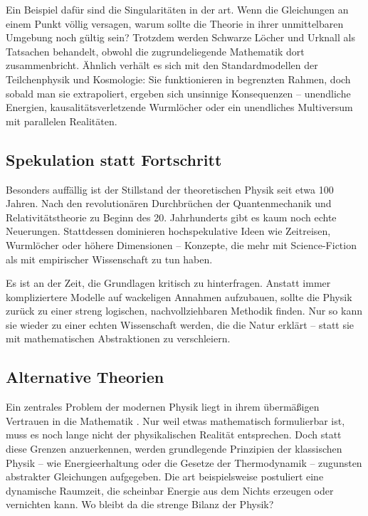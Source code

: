 Ein Beispiel dafür sind die Singularitäten in der \gls{art}. Wenn die Gleichungen an einem Punkt völlig versagen, warum sollte die Theorie in ihrer unmittelbaren Umgebung noch gültig sein?
Trotzdem werden Schwarze Löcher und Urknall als Tatsachen behandelt, obwohl die zugrundeliegende Mathematik dort zusammenbricht. Ähnlich verhält es sich mit den Standardmodellen der
Teilchenphysik und Kosmologie: Sie funktionieren in begrenzten Rahmen, doch sobald man sie extrapoliert, ergeben sich unsinnige Konsequenzen – unendliche Energien, kausalitätsverletzende
Wurmlöcher oder ein unendliches Multiversum mit parallelen Realitäten.

\subsection{Spekulation statt Fortschritt}
Besonders auffällig ist der Stillstand der theoretischen Physik seit etwa 100 Jahren. Nach den revolutionären Durchbrüchen der Quantenmechanik und Relativitätstheorie zu Beginn des
20. Jahrhunderts gibt es kaum noch echte Neuerungen. Stattdessen dominieren hochspekulative Ideen wie Zeitreisen, Wurmlöcher oder höhere Dimensionen – Konzepte, die mehr mit
Science-Fiction als mit empirischer Wissenschaft zu tun haben.

Es ist an der Zeit, die Grundlagen kritisch zu hinterfragen. Anstatt immer kompliziertere Modelle auf wackeligen Annahmen aufzubauen, sollte die Physik zurück zu einer streng logischen,
nachvollziehbaren Methodik finden. Nur so kann sie wieder zu einer echten Wissenschaft werden, die die Natur erklärt – statt sie mit mathematischen Abstraktionen zu verschleiern.

\subsection{Alternative Theorien}
Ein zentrales Problem der modernen Physik \cite{Smolin2006} liegt in ihrem übermäßigen Vertrauen in die Mathematik \cite{Hossenfelder2018}. Nur weil etwas mathematisch formulierbar ist,
muss es noch lange nicht der physikalischen Realität entsprechen. Doch statt diese Grenzen anzuerkennen, werden grundlegende Prinzipien der klassischen Physik – wie Energieerhaltung
oder die Gesetze der Thermodynamik – zugunsten abstrakter Gleichungen aufgegeben. Die \gls{art} beispielsweise postuliert eine dynamische Raumzeit, die scheinbar Energie aus dem Nichts
erzeugen oder vernichten kann. Wo bleibt da die strenge Bilanz der Physik?


